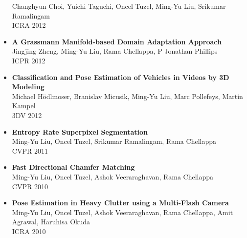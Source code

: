 \begin{itemize}
      Changhyun Choi, Yuichi Taguchi, Oncel Tuzel, Ming-Yu Liu, Srikumar Ramalingam\\ ICRA 2012\vspace{-2mm}
\item {\bf A Grassmann Manifold-based Domain Adaptation Approach}\\
			Jingjing Zheng, Ming-Yu Liu, Rama Chellappa, P Jonathan Phillips\\ ICPR 2012\vspace{-2mm}
\item {\bf Classification and Pose Estimation of Vehicles in Videos by 3D Modeling}\\%
      Michael Hödlmoser, Branislav Micusik, Ming-Yu Liu, Marc Pollefeys, Martin Kampel\\ 3DV 2012\vspace{-2mm}
\item {\bf Entropy Rate Superpixel Segmentation}\\                
			Ming-Yu Liu, Oncel Tuzel, Srikumar Ramalingam, Rama Chellappa\\ CVPR 2011\vspace{-2mm}
\item {\bf Fast Directional Chamfer Matching}\\                
			Ming-Yu Liu, Oncel Tuzel, Ashok Veeraraghavan, Rama Chellappa\\ CVPR 2010\vspace{-2mm}
\item {\bf Pose Estimation in Heavy Clutter using a Multi-Flash Camera}\\
      Ming-Yu Liu, Oncel Tuzel, Ashok Veeraraghavan, Rama Chellappa, Amit Agrawal, Haruhisa Okuda\\ ICRA 2010\vspace{-2mm}
\end{itemize}